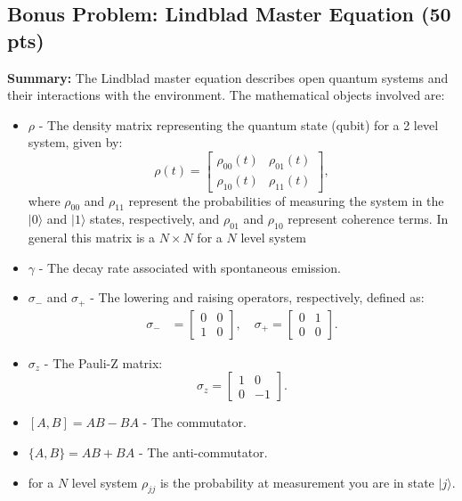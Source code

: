 \documentclass[12pt]{article}
\newcommand{\ket}[1]{| #1 \rangle}
\begin{document}
\subsection*{Bonus Problem: Lindblad Master Equation (50 pts)}

\textbf{Summary:} The Lindblad master equation describes open quantum systems and their interactions with the environment. The mathematical objects involved are:
\begin{itemize}
    \item $\rho$ - The density matrix representing the quantum state (qubit) for a 2 level system, given by:
    \begin{equation*}
        \rho(t) = \begin{bmatrix} \rho_{00}(t) & \rho_{01}(t) \\ \rho_{10}(t) & \rho_{11}(t) \end{bmatrix},
    \end{equation*}
    where $\rho_{00}$ and $\rho_{11}$ represent the probabilities of measuring the system in the $|0\rangle$ and $|1\rangle$ states, respectively, and $\rho_{01}$ and $\rho_{10}$ represent coherence terms. In general this matrix is a $N \times N$ for a $N$ level system
    \item $\gamma$ - The decay rate associated with spontaneous emission.
    \item $\sigma_-$ and $\sigma_+$ - The lowering and raising operators, respectively, defined as:
    \begin{align*}
        \sigma_- &= \begin{bmatrix} 0 & 0 \\ 1 & 0 \end{bmatrix}, \quad
        \sigma_+ = \begin{bmatrix} 0 & 1 \\ 0 & 0 \end{bmatrix}.
    \end{align*}
    \item $\sigma_z$ - The Pauli-Z matrix:
    \begin{equation*}
        \sigma_z = \begin{bmatrix} 1 & 0 \\ 0 & -1 \end{bmatrix}.
    \end{equation*}
    \item $[A, B] = AB - BA$ - The commutator.
    \item $\{A, B\} = AB + BA$ - The anti-commutator.
    \item for a $N$ level system $\rho_{jj}$ is the probability at measurement you are in state $\ket{j}$.
\end{itemize}
\end{document}
